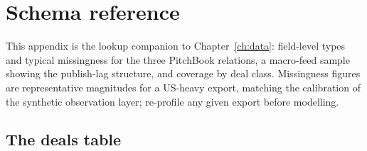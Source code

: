 \chapter{Schema reference}
\label{app:schema}

This appendix is the lookup companion to Chapter~\ref{ch:data}: field-level types and typical missingness
for the three PitchBook relations, a macro-feed sample showing the publish-lag structure, and coverage by
deal class. Missingness figures are representative magnitudes for a US-heavy export, matching the
calibration of the synthetic observation layer; re-profile any given export before modelling.

\section{The deals table}\label{app:schema-deals}

